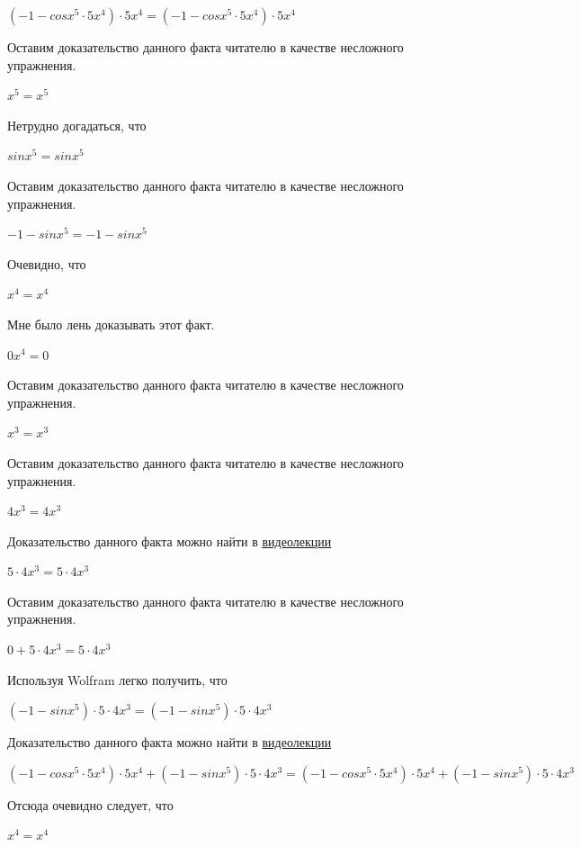 \documentclass[12pt,a4paper,fleqn]{article}
\theoremstyle{definition}
\begin{document}
$( -1  - cos{ x }^{ 5 } \cdot  5 { x }^{ 4 }) \cdot  5 { x }^{ 4 } = ( -1  - cos{ x }^{ 5 } \cdot  5 { x }^{ 4 }) \cdot  5 { x }^{ 4 }$

Оставим доказательство данного факта читателю в качестве несложного упражнения. 

${ x }^{ 5 } = { x }^{ 5 }$

Нетрудно догадаться, что 

$sin{ x }^{ 5 } = sin{ x }^{ 5 }$

Оставим доказательство данного факта читателю в качестве несложного упражнения. 

$ -1  - sin{ x }^{ 5 } =  -1  - sin{ x }^{ 5 }$

Очевидно, что 

${ x }^{ 4 } = { x }^{ 4 }$

Мне было лень доказывать этот факт.

$ 0 { x }^{ 4 } =  0 $

Оставим доказательство данного факта читателю в качестве несложного упражнения. 

${ x }^{ 3 } = { x }^{ 3 }$

Оставим доказательство данного факта читателю в качестве несложного упражнения. 

$ 4 { x }^{ 3 } =  4 { x }^{ 3 }$

Доказательство данного факта можно найти в \href{https://www.youtube.com/watch?v=dQw4w9WgXcQ}{видеолекции} 

$ 5  \cdot  4 { x }^{ 3 } =  5  \cdot  4 { x }^{ 3 }$

Оставим доказательство данного факта читателю в качестве несложного упражнения. 

$ 0  +  5  \cdot  4 { x }^{ 3 } =  5  \cdot  4 { x }^{ 3 }$

Используя Wolfram легко получить, что 

$( -1  - sin{ x }^{ 5 }) \cdot  5  \cdot  4 { x }^{ 3 } = ( -1  - sin{ x }^{ 5 }) \cdot  5  \cdot  4 { x }^{ 3 }$

Доказательство данного факта можно найти в \href{https://www.youtube.com/watch?v=dQw4w9WgXcQ}{видеолекции} 

$( -1  - cos{ x }^{ 5 } \cdot  5 { x }^{ 4 }) \cdot  5 { x }^{ 4 } + ( -1  - sin{ x }^{ 5 }) \cdot  5  \cdot  4 { x }^{ 3 } = ( -1  - cos{ x }^{ 5 } \cdot  5 { x }^{ 4 }) \cdot  5 { x }^{ 4 } + ( -1  - sin{ x }^{ 5 }) \cdot  5  \cdot  4 { x }^{ 3 }$

Отсюда очевидно следует, что 

${ x }^{ 4 } = { x }^{ 4 }$
\end{document}
